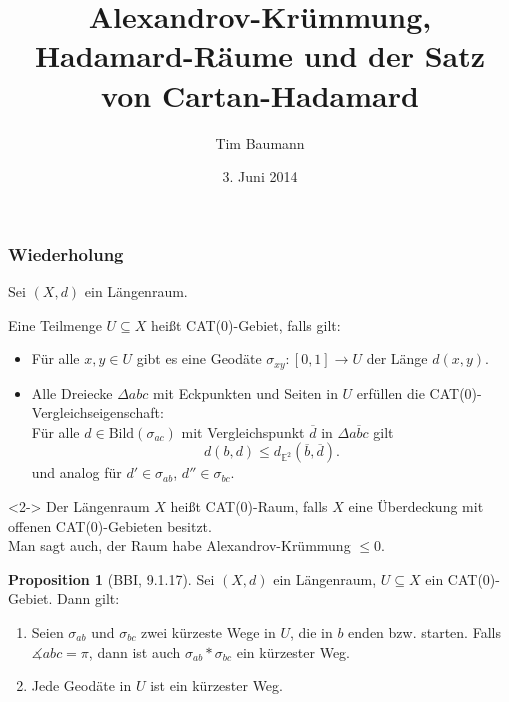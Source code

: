 \documentclass{beamer}
\title{Alexandrov-Krümmung, Hadamard-Räume und der Satz von Cartan-Hadamard}
\author{Tim Baumann}
\institute{Seminar Metrische Geometrie}
\date{3. Juni 2014}
\newcommand{\E}{\mathbb{E}} %
\newcommand{\I}{\left[0,1\right]} %
\newcommand{\Bild}{\mathrm{Bild}} %
\renewcommand{\emph}[1]{\textcolor{Emph}{#1}}
\theoremstyle{definition}
\newtheorem*{prop}{Proposition}
\begin{document}
\setlength{\abovedisplayskip}{2pt}
\setlength{\belowdisplayskip}{2pt}
\setlength{\abovedisplayshortskip}{2pt}
\setlength{\belowdisplayshortskip}{2pt}

\begin{frame}[plain]
  \titlepage
\end{frame}

\begin{frame}
  \frametitle{Wiederholung}

  Sei $(X, d)$ ein Längenraum.

  \begin{definition}
    Eine Teilmenge $U \subseteq X$ heißt \emph{CAT($0$)-Gebiet}, falls gilt:
    \begin{itemize}
      \item Für alle $x, y \in U$ gibt es eine Geodäte $\sigma_{xy} : \I \to U$ der Länge $d(x, y)$.
      \item Alle Dreiecke $\Delta abc$ mit Eckpunkten und Seiten in $U$ erfüllen die CAT($0$)-Vergleichseigenschaft:\\
      Für alle $d \in \Bild(\sigma_{ac})$ mit Vergleichspunkt $\overline{d}$ in $\Delta \overline{abc}$ gilt
      \[ d(b, d) \leq d_{\E^2}(\overline{b}, \overline{d}). \]
      und analog für $d' \in \sigma_{ab}$, $d'' \in \sigma_{bc}$.
    \end{itemize}
  \end{definition}

  \begin{definition}<2->
    Der Längenraum $X$ heißt \emph{CAT($0$)-Raum}, falls $X$ eine Überdeckung mit offenen CAT($0$)-Gebieten besitzt.\\
    Man sagt auch, der Raum habe \emph{Alexandrov-Krümmung $\leq 0$}.
  \end{definition}
\end{frame}

\begin{frame}
  \begin{prop}[BBI, 9.1.17]
    Sei $(X, d)$ ein Längenraum, $U \subseteq X$ ein CAT($0$)-Gebiet. Dann gilt:
    \begin{enumerate}
      \item Seien $\sigma_{ab}$ und $\sigma_{bc}$ zwei kürzeste Wege in $U$, die in $b$ enden bzw. starten. Falls $\measuredangle abc = \pi$, dann ist auch $\sigma_{ab} * \sigma_{bc}$ ein kürzester Weg.
      \item Jede Geodäte in $U$ ist ein kürzester Weg.
    \end{enumerate}
  \end{prop}
\end{frame}
\end{document}
